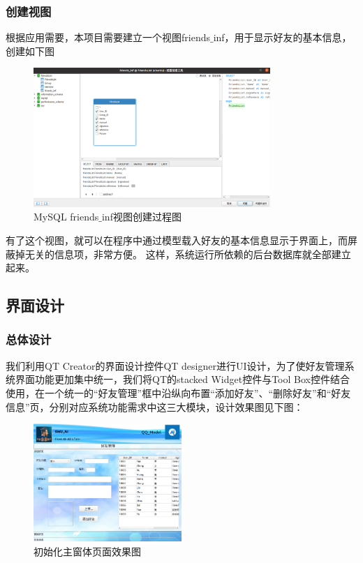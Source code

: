 \documentclass{progartcn}
\begin{document}
\subsubsection{创建视图}

根据应用需要，本项目需要建立一个视图friends$ \_ $inf，用于显示好友的基本信息，创建如下图

\begin{figure}[H]
	\centering
	\includegraphics[width=0.8\textwidth]{4.png}
	\caption{\centering  MySQL friends$ \_ $inf视图创建过程图}
\end{figure}
有了这个视图，就可以在程序中通过模型载入好友的基本信息显示于界面上，而屏蔽掉无关的信息项，非常方便。
这样，系统运行所依赖的后台数据库就全部建立起来。

\subsection{界面设计}

\subsubsection{总体设计}

我们利用QT Creator的界面设计控件QT designer进行UI设计，为了使好友管理系统界面功能更加集中统一，我们将QT的stacked Widget控件与Tool Box控件结合使用，在一个统一的“好友管理”框中沿纵向布置“添加好友”、“删除好友”和“好友信息”页，分别对应系统功能需求中这三大模块，设计效果图见下图：

\begin{figure}[H]
	\centering
	\includegraphics[width=0.5\textwidth]{5.png}
	\caption{\centering  初始化主窗体页面效果图}
\end{figure}
\end{document}
